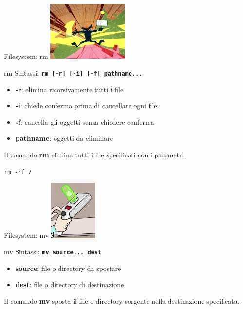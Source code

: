 \documentclass{beamer}
\begin{document}
    \begin{frame}{Filesystem: rm}
        \centering
        \includegraphics[height=3cm, keepaspectratio]{images/willy.jpg}

        \begin{block}{rm}
            Sintassi: \texttt{\textbf{rm [-r] [-i] [-f] pathname...}}

            \begin{itemize}
                \item \textbf{-r}: elimina ricorsivamente tutti i file
                \item \textbf{-i}: chiede conferma prima di cancellare ogni file
                \item \textbf{-f}: cancella gli oggetti senza chiedere conferma
                \item \textbf{pathname}: oggetti da eliminare
            \end{itemize}

            Il comando \textbf{rm} elimina tutti i file specificati con i parametri.
        \end{block}
    \end{frame}

    \begin{frame}{}
        \centering
        \Huge \texttt{rm -rf /}
    \end{frame}

    \begin{frame}{Filesystem: mv}
        \centering
        \includegraphics[height=3cm, keepaspectratio]{images/spara-porte.png}

        \begin{block}{mv}
            Sintassi: \texttt{\textbf{mv source... dest}}

            \begin{itemize}
                \item \textbf{source}: file o directory da spostare
                \item \textbf{dest}: file o directory di destinazione
            \end{itemize}

            Il comando \textbf{mv} sposta il file o directory sorgente nella destinazione specificata.
        \end{block}
    \end{frame}
\end{document}

